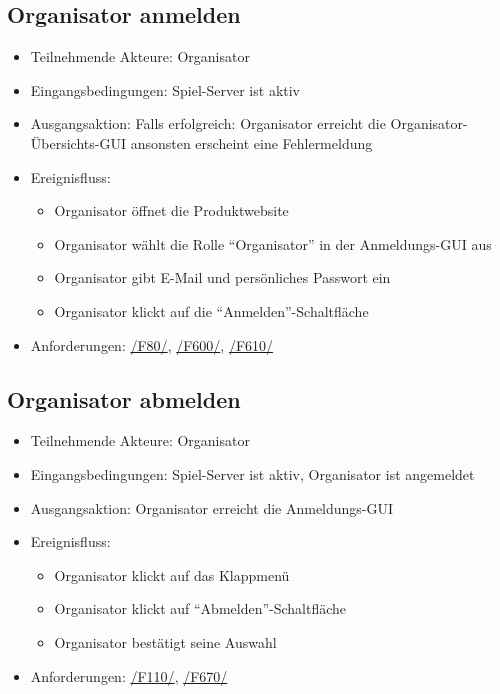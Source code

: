 \documentclass[a4paper]{scrreprt}
\begin{document}
    \subsection{Organisator anmelden}
    \begin{itemize}
        \item Teilnehmende Akteure: \Gls{Organisator}
        \item Eingangsbedingungen: \Gls{Spiel-Server} ist aktiv
        \item Ausgangsaktion: Falls erfolgreich: \Gls{Organisator} erreicht die Organisator-Übersichts-GUI ansonsten erscheint eine Fehlermeldung
        \item Ereignisfluss:
        \begin{itemize}
            \item \Gls{Organisator} öffnet die Produktwebsite
            \item \Gls{Organisator} wählt die Rolle \enquote{\Gls{Organisator}} in der Anmeldungs-GUI aus
            \item \Gls{Organisator} gibt E-Mail und persönliches Passwort ein
            \item \Gls{Organisator} klickt auf die \enquote{Anmelden}-Schaltfläche
        \end{itemize}
        \item Anforderungen: \hyperlink{F80}{/F80/}, \hyperlink{F600}{/F600/},  \hyperlink{F610}{/F610/}
    \end{itemize}

    \subsection{Organisator abmelden}
    \begin{itemize}
        \item Teilnehmende Akteure: \Gls{Organisator}
        \item Eingangsbedingungen: \Gls{Spiel-Server} ist aktiv, \Gls{Organisator} ist angemeldet
        \item Ausgangsaktion: \Gls{Organisator} erreicht die Anmeldungs-GUI
        \item Ereignisfluss:
        \begin{itemize}
            \item \Gls{Organisator} klickt auf das Klappmenü
            \item \Gls{Organisator} klickt auf \enquote{Abmelden}-Schaltfläche
            \item \Gls{Organisator} bestätigt seine Auswahl
        \end{itemize}
        \item Anforderungen: \hyperlink{F110}{/F110/}, \hyperlink{F670}{/F670/}
    \end{itemize}
\end{document}
